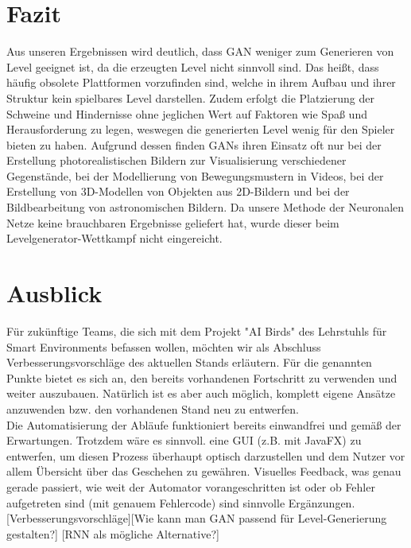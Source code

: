 \documentclass[11pt]{article}
\begin{document}
\section{Fazit}
Aus unseren Ergebnissen wird deutlich, dass GAN weniger zum Generieren von Level geeignet ist, da die erzeugten Level nicht sinnvoll sind. Das heißt, dass häufig obsolete Plattformen vorzufinden sind, welche in ihrem Aufbau und ihrer Struktur kein spielbares Level darstellen. Zudem erfolgt die Platzierung der Schweine und Hindernisse ohne jeglichen Wert auf Faktoren wie Spaß und Herausforderung zu legen, weswegen die generierten Level wenig für den Spieler bieten zu haben. Aufgrund dessen finden GANs ihren Einsatz oft nur bei der Erstellung photorealistischen Bildern zur Visualisierung verschiedener Gegenstände, bei der Modellierung von Bewegungsmustern in Videos, bei der Erstellung von 3D-Modellen von Objekten aus 2D-Bildern und bei der  Bildbearbeitung von astronomischen Bildern. Da unsere Methode der Neuronalen Netze keine brauchbaren Ergebnisse geliefert hat, wurde dieser beim Levelgenerator-Wettkampf nicht eingereicht. 
\section{Ausblick}
Für zukünftige Teams, die sich mit dem Projekt "AI Birds" des Lehrstuhls für Smart Environments befassen wollen, möchten wir als Abschluss Verbesserungsvorschläge des aktuellen Stands erläutern. Für die genannten Punkte bietet es sich an, den bereits vorhandenen Fortschritt zu verwenden und weiter auszubauen. Natürlich ist es aber auch möglich, komplett eigene Ansätze anzuwenden bzw. den vorhandenen Stand neu zu entwerfen. \\ Die Automatisierung der Abläufe funktioniert bereits einwandfrei und gemäß der Erwartungen. Trotzdem wäre es sinnvoll. eine GUI (z.B. mit JavaFX) zu entwerfen, um diesen Prozess überhaupt optisch darzustellen und dem Nutzer vor allem Übersicht über das Geschehen zu gewähren. Visuelles Feedback, was genau gerade passiert, wie weit der Automator vorangeschritten ist oder ob Fehler aufgetreten sind (mit genauem Fehlercode) sind sinnvolle Ergänzungen.
[Verbesserungsvorschläge][Wie kann man GAN passend für Level-Generierung gestalten?] [RNN als mögliche Alternative?]
\end{document}
